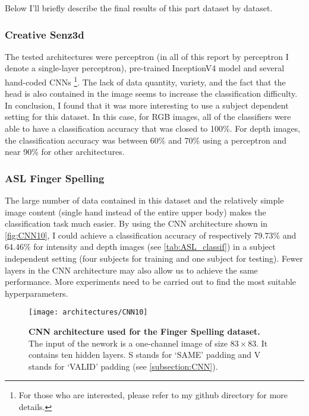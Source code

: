 Below I'll briefly describe the final results of this part dataset by
dataset.

\subsubsection{Creative Senz3d}

The tested architectures were perceptron (in all of this report by
perceptron I denote a single-layer perceptron), pre-trained InceptionV4
model \cite{C. Szegedy 2017} and several hand-coded CNNs%
\footnote{For those who are interested, please refer to my github
directory for more details.}.
The lack of data quantity, variety, and the fact that the head is also
contained in the image seems to increase the classification difficulty.
In conclusion, I found that it was more interesting to use a subject
dependent setting for this dataset. In this case, for RGB images,
all of the classifiers were able to have a classification accuracy that was
closed to 100\%. For depth images, the classification accuracy was
between 60\% and 70\% using a perceptron and near 90\% for other
architectures.

\subsubsection{ASL Finger Spelling} \label{subsubsection:ASL_CNN}

The large number of data contained in this dataset and the relatively
simple image content (single hand instead of the entire upper body)
makes the classification task much easier. By using the CNN architecture
shown in \autoref{fig:CNN10}, I could achieve a classification accuracy
of respectively 79.73\% and 64.46\% for intensity and depth images
(see \autoref{tab:ASL_classif})
in a subject independent setting (four subjects for training and one
subject for testing). Fewer layers in the CNN architecture may also allow
us to achieve the same performance. More experiments need to be carried
out to find the most suitable hyperparameters.

\vspace{-1em}
\begin{figure}[H]
  \centering
  \texttt{[image: architectures/CNN10]}
  \caption{%
    \textbf{CNN architecture used for the Finger Spelling  dataset.}
      \\[0.1em]
    The input of the nework is a one-channel image of size $83 \times 83$.
      It contains ten hidden layers. S stands for `SAME' padding
      and V stands for `VALID' padding (see \ref{subsection:CNN}).}
  \label{fig:CNN10}
\end{figure}

